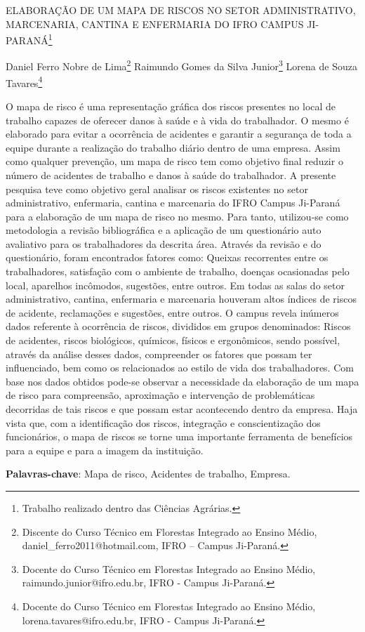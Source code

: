 \documentclass[article,12pt,onesidea,4paper,english,brazil]{abntex2}
\begin{document}
	
	
	\frenchspacing 
	
	\begin{center}
		\LARGE ELABORAÇÃO DE UM MAPA DE RISCOS NO SETOR ADMINISTRATIVO,
		MARCENARIA, CANTINA E ENFERMARIA DO IFRO CAMPUS JI-PARANÁ\footnote{Trabalho realizado dentro das Ciências Agrárias.}
		
		\normalsize
		Daniel Ferro Nobre de Lima\footnote{Discente do Curso Técnico em Florestas Integrado ao Ensino Médio, daniel\_ferro2011@hotmail.com, IFRO – Campus Ji-Paraná.} 
		Raimundo Gomes da Silva Junior\footnote{Docente do Curso Técnico em Florestas Integrado ao Ensino Médio, raimundo.junior@ifro.edu.br, IFRO - Campus Ji-Paraná.} 
	Lorena de Souza Tavares\footnote{Docente do Curso Técnico em Florestas Integrado ao Ensino Médio, lorena.tavares@ifro.edu.br,
		IFRO - Campus Ji-Paraná.} 
	\end{center}
	
	\noindent O mapa de risco é uma representação gráfica dos riscos presentes no
	local de trabalho capazes de oferecer danos à saúde e à vida do trabalhador. O
	mesmo é elaborado para evitar a ocorrência de acidentes e garantir a segurança de
	toda a equipe durante a realização do trabalho diário dentro de uma empresa. Assim
	como qualquer prevenção, um mapa de risco tem como objetivo final reduzir o
	número de acidentes de trabalho e danos à saúde do trabalhador. A presente
	pesquisa teve como objetivo geral analisar os riscos existentes no setor
	administrativo, enfermaria, cantina e marcenaria do IFRO Campus Ji-Paraná para a
	elaboração de um mapa de risco no mesmo. Para tanto, utilizou-se como
	metodologia a revisão bibliográfica e a aplicação de um questionário auto avaliativo
	para os trabalhadores da descrita área. Através da revisão e do questionário, foram
	encontrados fatores como: Queixas recorrentes entre os trabalhadores, satisfação
	com o ambiente de trabalho, doenças ocasionadas pelo local, aparelhos incômodos,
	sugestões, entre outros. Em todas as salas do setor administrativo, cantina,
	enfermaria e marcenaria houveram altos índices de riscos de acidente, reclamações
	e sugestões, entre outros. O campus revela inúmeros dados referente à ocorrência
	de riscos, divididos em grupos denominados: Riscos de acidentes, riscos biológicos,
	químicos, físicos e ergonômicos, sendo possível, através da análise desses dados,
	compreender os fatores que possam ter influenciado, bem como os relacionados ao
	estilo de vida dos trabalhadores. Com base nos dados obtidos pode-se observar a
	necessidade da elaboração de um mapa de risco para compreensão, aproximação e
	intervenção de problemáticas decorridas de tais riscos e que possam estar
	acontecendo dentro da empresa. Haja vista que, com a identificação dos riscos,
	integração e conscientização dos funcionários, o mapa de riscos se torne uma
	importante ferramenta de benefícios para a equipe e para a imagem da instituição.
	
	\vspace{\onelineskip}
	
	\noindent
	\textbf{Palavras-chave}: Mapa de risco, Acidentes de trabalho, Empresa.
	
\end{document}
